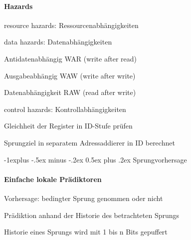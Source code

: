 \documentclass[a4paper]{article}
\makeatletter
\renewcommand{\subsection}{\@startsection{subsection}{2}{0mm}%
                                {-1explus -.5ex minus -.2ex}%
                                {0.5ex plus .2ex}%
                                {\normalfont\normalsize\bfseries}}
\makeatother
\begin{document}
\begin{multicols}{3}
  \paragraph*{Hazards}
  \begin{itemize*}
    \item resource hazards: Ressourcenabhängigkeiten
    \item data hazards: Datenabhängigkeiten
    \begin{description*}
      \item[Antidatenabhängig] WAR (write after read)
      \item[Ausgabeabhängig] WAW (write after write)
      \item[Datenabhängigkeit] RAW (read after write)
    \end{description*}
    \item control hazards: Kontrollabhängigkeiten
    \begin{itemize*}
      \item Gleichheit der Register in ID-Stufe prüfen
      \item Sprungziel in separatem Adressaddierer in ID berechnet
    \end{itemize*}
  \end{itemize*}
  
  \subsection{Sprungvorhersage}
  \paragraph{Einfache lokale Prädiktoren}
  \begin{itemize*}
    \item Vorhersage: bedingter Sprung genommen oder nicht
    \item Prädiktion anhand der Historie des betrachteten Sprungs
    \item Historie eines Sprungs wird mit 1 bis n Bits gepuffert
  \end{itemize*}
  

\end{multicols}
\end{document}
